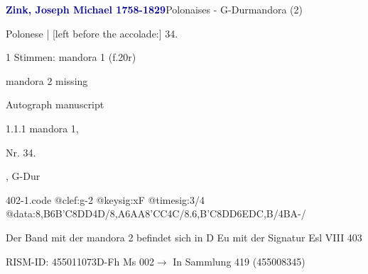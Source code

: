 \documentclass[twocolumn, 12pt]{book}
\begin{document}
\par \vspace{16pt} \textcolor{darkblue}{\textbf{Zink, Joseph Michael  1758-1829}}\hfillplus{\textbf{[402]}}\newline Polonaises - G-Dur\newline mandora (2)
\par \begin{itshape}[f.20r, at left:] Polonese | [left before the accolade:] 34.\end{itshape} 
\par \textcolor{darkblue}{}  1 Stimmen: mandora 1  (f.20r)\newline \begin{small} mandora 2 missing\end{small} \newline Autograph manuscript
\par 1.1.1  mandora 1, \begin{itshape}Nr. 34.\end{itshape}, G-Dur  
\begin{filecontents*}{402-1.code}
@clef:g-2
@keysig:xF
@timesig:3/4
@data:{8,B6B'C}8DD4D/{8,A6AA}{8'CC}4C/{8.6,B'C}8DD6EDC,B/4BA-/
\end{filecontents*}
\newline %
\par Der Band mit der mandora 2 befindet sich in D Eu mit der Signatur Esl VIII 403
\par RISM-ID: 455011073\newline D-Fh  Ms 002\newline $\rightarrow$ In Sammlung 419 (455008345)
      
\end{document}
